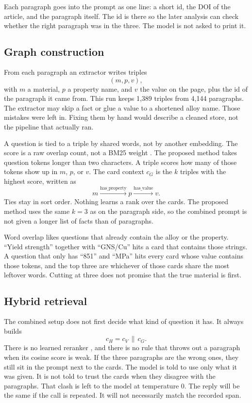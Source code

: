 \documentclass[conference]{IEEEtran}
\begin{document}
Each paragraph goes into the prompt as one line: a short id, the DOI of the article, and the paragraph itself. The id is there so the later analysis can check whether the right paragraph was in the three. The model is not asked to print it.

\subsection{Graph construction}
From each paragraph an extractor writes triples
\begin{equation}
(m, p, v),
\end{equation}
with \(m\) a material, \(p\) a property name, and \(v\) the value on the page, plus the id of the paragraph it came from. This run keeps 1{,}389 triples from 4{,}144 paragraphs. The extractor may skip a fact or glue a value to a shortened alloy name. Those mistakes were left in. Fixing them by hand would describe a cleaned store, not the pipeline that actually ran.

A question is tied to a triple by shared words, not by another embedding. The score is a raw overlap count, not a BM25 weight \cite{robertson2009bm25}. The proposed method takes question tokens longer than two characters. A triple scores how many of those tokens show up in \(m\), \(p\), or \(v\). The card context \(c_G\) is the \(k\) triples with the highest score, written as
\begin{equation}
m \xrightarrow{\text{has\_property}} p \xrightarrow{\text{has\_value}} v.
\end{equation}
Ties stay in sort order. Nothing learns a rank over the cards. The proposed method uses the same \(k=3\) as on the paragraph side, so the combined prompt is not given a longer list of facts than of paragraphs.

Word overlap likes questions that already contain the alloy or the property. ``Yield strength'' together with ``GNS/Cu'' hits a card that contains those strings. A question that only has ``851'' and ``MPa'' hits every card whose value contains those tokens, and the top three are whichever of those cards share the most leftover words. Cutting at three does not promise that the true material is first.

\subsection{Hybrid retrieval}
The combined setup does not first decide what kind of question it has. It always builds
\begin{equation}
c_H = c_V \,\|\, c_G.
\end{equation}
There is no learned reranker \cite{nogueira2019bert}, and there is no rule that throws out a paragraph when its cosine score is weak. If the three paragraphs are the wrong ones, they still sit in the prompt next to the cards. The model is told to use only what it was given. It is not told to trust the cards when they disagree with the paragraphs. That clash is left to the model at temperature 0. The reply will be the same if the call is repeated. It will not necessarily match the recorded span.
\end{document}
